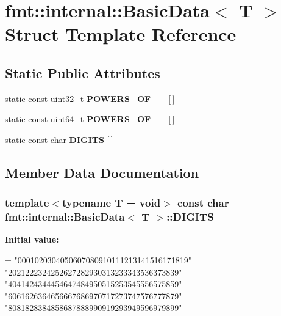 \hypertarget{structfmt_1_1internal_1_1BasicData}{}\section{fmt\+:\+:internal\+:\+:Basic\+Data$<$ T $>$ Struct Template Reference}
\label{structfmt_1_1internal_1_1BasicData}
\subsection*{Static Public Attributes}
\begin{DoxyCompactItemize}
\item 
static const uint32\+\_\+t {\bfseries P\+O\+W\+E\+R\+S\+\_\+\+O\+F\+\_\+\_} \mbox{[}$\,$\mbox{]}
\item 
static const uint64\+\_\+t {\bfseries P\+O\+W\+E\+R\+S\+\_\+\+O\+F\+\_\+\_} \mbox{[}$\,$\mbox{]}
\item 
static const char {\bfseries D\+I\+G\+I\+TS} \mbox{[}$\,$\mbox{]}
\end{DoxyCompactItemize}


\subsection{Member Data Documentation}
\subsubsection[{\texorpdfstring{D\+I\+G\+I\+TS}{DIGITS}}]{\setlength{\rightskip}{0pt plus 5cm}template$<$typename T  = void$>$ const char {\bf fmt\+::internal\+::\+Basic\+Data}$<$ T $>$\+::D\+I\+G\+I\+TS\hspace{0.3cm}{\ttfamily [static]}}\hypertarget{structfmt_1_1internal_1_1BasicData_abc0f1b67b25a98d0aa1f2b25c8649e59}{}\label{structfmt_1_1internal_1_1BasicData_abc0f1b67b25a98d0aa1f2b25c8649e59}
{\bfseries Initial value\+:}
\begin{DoxyCode}
=
    \textcolor{stringliteral}{"0001020304050607080910111213141516171819"}
    \textcolor{stringliteral}{"2021222324252627282930313233343536373839"}
    \textcolor{stringliteral}{"4041424344454647484950515253545556575859"}
    \textcolor{stringliteral}{"6061626364656667686970717273747576777879"}
    \textcolor{stringliteral}{"8081828384858687888990919293949596979899"}
\end{DoxyCode}
